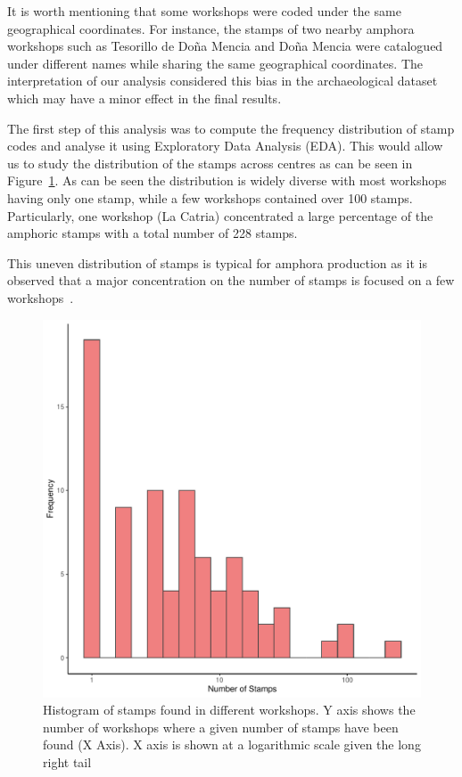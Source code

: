 
It is worth mentioning that some workshops were coded under the same geographical coordinates. For instance, the stamps of two nearby amphora workshops such as Tesorillo de Do\~na Mencia and Do\~na Mencia were catalogued under different names while sharing the same geographical coordinates. The interpretation of our analysis considered this bias in the archaeological dataset which may have a minor effect in the final results. 

The first step of this analysis was to compute the frequency distribution of stamp codes and analyse it using Exploratory Data Analysis (EDA). This would allow us to study the distribution of the stamps across centres as can be seen in Figure~\ref{stamps}. As can be seen the distribution is widely diverse with most workshops having only one stamp, while a few workshops contained over 100 stamps. Particularly, one workshop (La Catria) concentrated a large percentage of the amphoric stamps with a total number of 228 stamps.

This uneven distribution of stamps is typical for amphora production as it is observed that a major concentration on the number of stamps is focused on a few workshops~\citep{coto-sarmiento_identifying_2018}.

\begin{figure}[htp]
	\centering
\includegraphics[width=\linewidth]{frequencystamp.pdf}
\caption{Histogram of stamps found in different workshops. Y axis shows the number of workshops where a given number of stamps have been found (X Axis). X axis is shown at a logarithmic scale given the long right tail}
\label{stamps}
\end{figure} 

